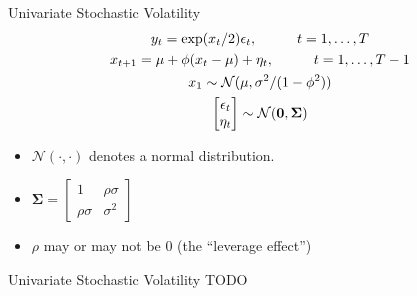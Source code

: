 \documentclass[
  ignorenonframetext,
]{beamer}
\begin{document}
\begin{frame}{Univariate Stochastic Volatility}
\protect\hypertarget{univariate-stochastic-volatility}{}
\[
\begin{gather*}
y_t = \exp(x_t/2)\epsilon_t, \hspace{10mm} t = 1, \ldots, T \\
x_{t+1} = \mu + \phi(x_t - \mu) + \eta_t, \hspace{10mm} t = 1, \ldots, T-1 \\
x_1 \sim \mathcal{N}(\mu, \sigma^2 / (1-\phi^2)) \\
\begin{bmatrix}
\epsilon_t \\
\eta_t
\end{bmatrix}
\sim 
\mathcal{N}(\boldsymbol{0}, \boldsymbol{\Sigma})
\end{gather*}
\]

\begin{itemize}
\item
  \(\mathcal{N}(\cdot, \cdot)\) denotes a normal distribution.
\item
  \(\boldsymbol{\Sigma} = \begin{bmatrix}1 & \rho\sigma \\ \rho\sigma & \sigma^2 \end{bmatrix}\)
\item
  \(\rho\) may or may not be \(0\) (the ``leverage effect'')
\end{itemize}
\end{frame}

\begin{frame}{Univariate Stochastic Volatility}
\protect\hypertarget{univariate-stochastic-volatility-1}{}
TODO
\end{frame}
\end{document}
